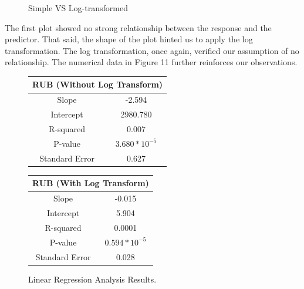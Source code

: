 \documentclass{article}
\begin{document}
\begin{figure}[H]
  \centering
  \hfill
  \caption{Simple VS Log-transformed}
\end{figure}

The first plot showed no strong relationship between the response and the
predictor. That said, the shape of the plot hinted us to apply the log
transformation. The log transformation, once again, verified our assumption
of no relationship. The numerical data in Figure 11 further reinforces our
observations.

\begin{figure}[H]
  \centering
  \begin{tabular}{*{2}{c}}
    \toprule
    \multicolumn{2}{c}{RUB (Without Log Transform)}\\
    \midrule
    Slope          & -2.594\\
    \midrule
    Intercept      & 2980.780\\
    \midrule
    R-squared      & 0.007\\
    \midrule
    P-value        & $3.680 * 10^{-5}$\\
    \midrule
    Standard Error & 0.627\\
    \bottomrule
  \end{tabular}
  \quad
  \begin{tabular}{*{2}{c}}
    \toprule
    \multicolumn{2}{c}{RUB (With Log Transform)}\\
    \midrule
    Slope          & -0.015\\
    \midrule
    Intercept      & 5.904\\
    \midrule
    R-squared      & 0.0001\\
    \midrule
    P-value        & $0.594 * 10^{-5}$\\
    \midrule
    Standard Error & 0.028\\
    \bottomrule
  \end{tabular}
  \caption{Linear Regression Analysis Results.}
\end{figure}
\end{document}

